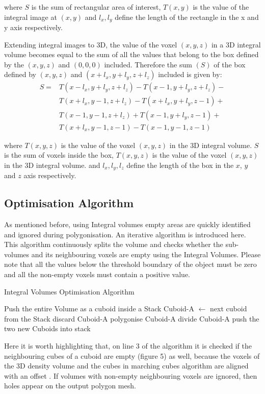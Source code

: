 \documentclass{subfiles}
\begin{document}
where 	$S$ is the sum of rectangular area of interest, $T(x, y)$ is the value of the integral image at $(x, y)$ and $l_x, l_y$ define the length of the rectangle in the x and y axis respectively. 

Extending integral images to 3D, the value of the voxel $(x ,y, z)$ in a 3D integral volume becomes equal to the sum of all the values that belong to the box defined by the $(x, y, z)$ and $(0, 0, 0)$ included. 
Therefore the sum $(S)$ of the box defined by $(x, y, z)$ and $(x+l_x, y+l_y, z+l_z)$ included is given by:
\begin{equation}
\begin{split}
S = & T(x-l_x,y+l_y,z+l_z) - 
T(x-1,y+l_y,z+l_z) - \\
&  T(x+l_x,y-1,z+l_z) - 	
T(x+l_x,y+l_y,z-1) + \\
&  T(x-1,y-1,z+l_z)   +
T(x-1,y+l_y,z-1)   +  \\
&  T(x+l_x,y-1,z-1)   -
T(x-1,y-1,z-1)
\end{split}
\end{equation}

where 	$T(x, y, z)$ is the value of the voxel $(x, y, z)$ in the 3D integral volume.  
$S$ is the sum of voxels inside the box, $T(x, y, z)$ is the value of the voxel $(x, y, z)$ in the 3D integral volume. and $l_x, l_y, l_z$ define the length of the box in the $x$, $y$ and $z$ axis respectively. 



\subsection{Optimisation Algorithm}\label{sec:IVoptApproach}
As mentioned before, using Integral volumes empty areas are quickly identified and ignored during polygonisation. An iterative algorithm is introduced here. This algorithm continuously splits the volume and checks whether the sub-volumes and its neighbouring voxels are empty using the Integral Volumes. Please note that all the values below the threshold boundary of the object must be zero and all the non-empty voxels must contain a positive value.  

\begin{algorithm}
	\caption{Integral Volumes Optimisation Algorithm}
	\label{alg:IVoptSimple}
	\centering
	\begin{algorithmic}[1]
		\State Push the entire Volume as a cuboid inside a Stack
		\State Cuboid-A   $\gets$  next cuboid from the Stack 
		\State	discard Cuboid-A
		\State polygonise Cuboid-A
		\Else 
		\State divide Cuboid-A
		\State push the two new Cuboids into stack
		\EndIf
		\EndWhile
	\end{algorithmic}
\end{algorithm}
Here it is worth highlighting that, on line 3 of the algorithm it is checked if the neighbouring cubes of a cuboid are empty (figure 5) as well, because the voxels of the 3D density volume and the cubes in marching cubes algorithm are  aligned with an offset \cite{Miltiadou2015}. If volumes with non-empty neighbouring voxels are ignored, then holes appear on the output polygon mesh. 		
\end{document}
